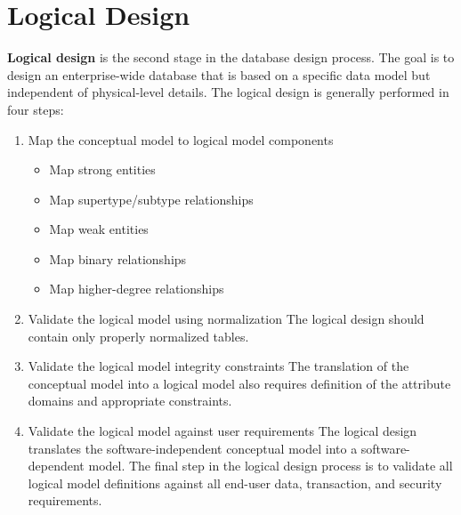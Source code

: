\documentclass[a4paper, 12pt, titlepage]{report}
\begin{document}
\section{Logical Design}
\textbf{Logical design} is the second stage in the database design process. The goal is to design an enterprise-wide database that is based on a specific data model but independent of physical-level details. The logical design is generally performed in four steps:
\begin{enumerate}
\item Map the conceptual model to logical model components
\begin{itemize}
\item Map strong entities
\item Map supertype/subtype relationships
\item Map weak entities
\item Map binary relationships
\item Map higher-degree relationships
\end{itemize}
\item Validate the logical model using normalization
The logical design should contain only properly normalized tables.
\item Validate the logical model integrity constraints
The translation of the conceptual model into a logical model also requires definition of the attribute domains and appropriate constraints.
\item Validate the logical model against user requirements
The logical design translates the software-independent conceptual model into a software-dependent model. The final step in the logical design process is to validate all logical model definitions against all end-user data, transaction, and security requirements. 
\end{enumerate}
\end{document}
